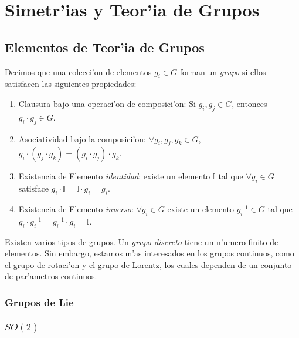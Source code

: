 \chapter{Simetr'ias y Teor'ia de Grupos}
\section{Elementos de Teor'ia de Grupos}

Decimos que una colecci'on de elementos $g_i\in G$ forman un \textit{grupo} si ellos satisfacen las siguientes propiedades:
\begin{enumerate}
\item Clausura bajo una operaci'on de composici'on: Si $g_i,g_j\in G$, entonces $g_i\cdot g_j\in G$.
\item Asociatividad bajo la composici'on: $\forall g_i,g_j,g_k\in G$, 
$g_i\cdot (g_j\cdot g_k)=(g_i\cdot g_j)\cdot g_k$.

\item Existencia de Elemento \textit{identidad}: existe un elemento $\mathbb{I}$ tal que $\forall g_i\in G$ satisface $g_i\cdot \mathbb{I}=\mathbb{I}\cdot g_i=g_i$.
\item Existencia de Elemento \textit{inverso}: $\forall g_i\in G$ existe un elemento $g_i^{-1}\in G$ tal que $g_i \cdot g_i^{-1}=g_i^{-1} \cdot g_i=\mathbb{I}$.
\end{enumerate} 

Existen varios tipos de grupos. Un \textit{grupo discreto} tiene un n'umero finito de elementos. Sin embargo, estamos m'as interesados en los grupos continuos, como el grupo de rotaci'on y el grupo de Lorentz, los cuales dependen de un conjunto de par'ametros continuos.

\subsection{Grupos de Lie}

\subsection{$SO(2)$}

